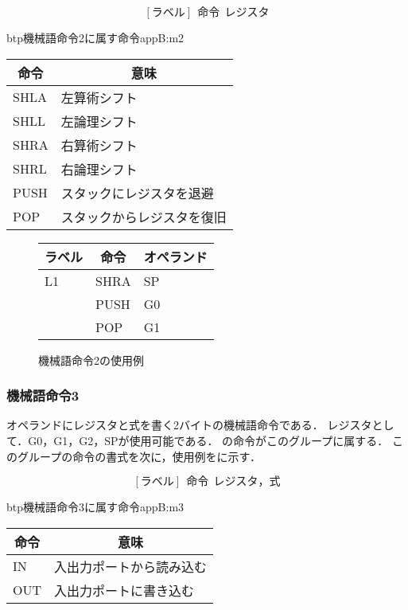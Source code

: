 {\small\[ %
[ラベル]~~命令~~レジスタ \]}

\begin{mytable}{btp}{機械語命令2に属す命令}{appB:m2}
{\small\begin{tabular}{l|l}
\hline\hline
\multicolumn{1}{c|}{命令} & \multicolumn{1}{c}{意味} \\\hline
SHLA & 左算術シフト \\
SHLL & 左論理シフト \\
SHRA & 右算術シフト \\
SHRL & 右論理シフト \\
PUSH & スタックにレジスタを退避 \\
POP  & スタックからレジスタを復旧
\end{tabular}}
\end{mytable}

\begin{figure}[btp]
\begin{center}
{\tt\small\begin{tabular}{|l|l|l|}\hline
\multicolumn{1}{|c|}{ラベル} & 
        \multicolumn{1}{c|}{命令} & \multicolumn{1}{c|}{オペランド} \\\hline
L1  & SHRA &  SP \\
    & PUSH &  G0 \\
    & POP  &  G1 \\\hline
\end{tabular}}
\caption{機械語命令2の使用例}
\label{fig:appB:m2ex}
\end{center}
\end{figure}

\subsubsection{機械語命令3}
オペランドにレジスタと式を書く2バイトの機械語命令である．
レジスタとして．G0，G1，G2，SPが使用可能である．
の命令がこのグループに属する．
このグループの命令の書式を次に，使用例をに示す．

{\small\[ %
[ラベル]~~命令~~レジスタ，式 \]}

\begin{mytable}{btp}{機械語命令3に属す命令}{appB:m3}
{\small\begin{tabular}{l|l}
\hline\hline
\multicolumn{1}{c|}{命令} & \multicolumn{1}{c}{意味} \\\hline
IN & 入出力ポートから読み込む \\
OUT & 入出力ポートに書き込む
\end{tabular}}
\end{mytable}

